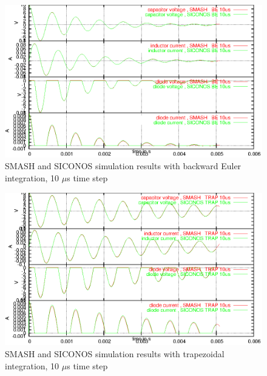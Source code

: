 \documentclass[10pt]{article}
\begin{document}
\begin{figure}[hbt]
\begin{center}
\includegraphics[width=12cm]{comp_SMASH_SICONOS_BE10us.eps}
\end{center}
\caption{SMASH and SICONOS simulation results with backward Euler integration, 10 $\mu$s time step}
\label{fig-comp-SMASH-SICONOS-BE10us}
\end{figure}

\begin{figure}[hbt]
\begin{center}
\includegraphics[width=12cm]{comp_SMASH_SICONOS_TRAP10us.eps}
\end{center}
\caption{SMASH and SICONOS simulation results with trapezoidal integration, 10 $\mu$s time step}
\label{fig-comp-SMASH-SICONOS-TRAP10us}
\end{figure}
\end{document}
